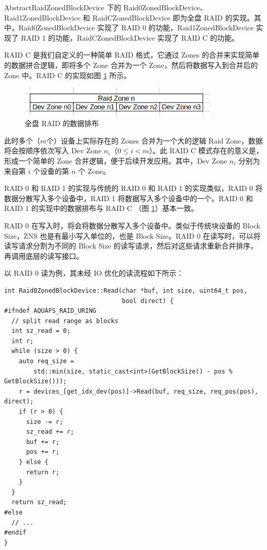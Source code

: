 AbstractRaidZonedBlockDevice 下的 Raid0ZonedBlockDevice、Raid1ZonedBlockDevice 和 RaidCZonedBlockDevice 即为全盘 RAID 的实现。其中，Raid0ZonedBlockDevice 实现了 RAID 0 的功能，Raid1ZonedBlockDevice 实现了 RAID 1 的功能，RaidCZonedBlockDevice 实现了 RAID C 的功能。

RAID C 是我们自定义的一种简单 RAID 格式，它通过 Zones 的合并来实现简单的数据拼合逻辑，即将多个 Zone 合并为一个 Zone，然后将数据写入到合并后的 Zone 中。RAID C 的实现如图 \ref{raid-c} 所示。

\begin{figure}[htbp]
  \centering
  \includegraphics[width=0.85\textwidth]{fig/raid-c.png}
  \caption{ 全盘 RAID 的数据排布 }
  \label{raid-c}
\end{figure}

此时多个（$m$个）设备上实际存在的 Zones 合并为一个大的逻辑 Raid Zone，数据将会按顺序依次写入 Dev Zone $n_{i}$（$0 \le i < m$）。此 RAID C 模式存在的意义是，形成一个简单的 Zone 合并逻辑，便于后续开发应用。其中，Dev Zone $n_i$ 分别为来自第 $i$ 个设备的第 $n$ 个 Zone。

RAID 0 和 RAID 1 的实现与传统的 RAID 0 和 RAID 1 的实现类似，RAID 0 将数据分散写入多个设备中，RAID 1 将数据写入多个设备中的一个。RAID 0 和 RAID 1 的实现中的数据排布与 RAID C （图 \ref{raid-c}）基本一致。

RAID 0 在写入时，将会将数据分散写入多个设备中。类似于传统块设备的 Block Size，ZNS 也是有最小写入单位的，也是 Block Size。RAID 0 在读写时，可以将读写请求分割为不同的 Block Size 的读写请求，然后对这些请求重新合并排序，再调用底层的读写接口。

以 RAID 0 读为例，其未经 IO 优化的读流程如下所示：

\begin{lstlisting}
int Raid0ZonedBlockDevice::Read(char *buf, int size, uint64_t pos,
                                bool direct) {
#ifndef AQUAFS_RAID_URING
  // split read range as blocks
  int sz_read = 0;
  int r;
  while (size > 0) {
    auto req_size =
        std::min(size, static_cast<int>(GetBlockSize() - pos % GetBlockSize()));
    r = devices_[get_idx_dev(pos)]->Read(buf, req_size, req_pos(pos), direct);
    if (r > 0) {
      size -= r;
      sz_read += r;
      buf += r;
      pos += r;
    } else {
      return r;
    }
  }
  return sz_read;
#else
  // ...
#endif
}
\end{lstlisting}

